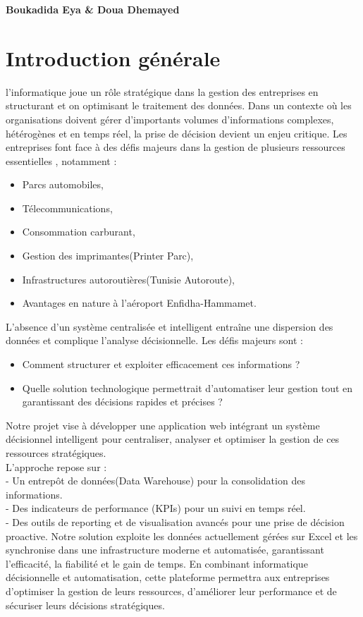 \documentclass[a4paper,11pt]{report}
\begin{document}
\vspace{0.2cm}
\noindent\textbf{Boukadida Eya \& Doua Dhemayed}


\tableofcontents


\clearpage

\newpage 
\section*{ Introduction générale}
l'informatique joue un rôle stratégique dans la gestion des entreprises en structurant et on optimisant le traitement des données. Dans un contexte où les organisations doivent gérer d'importants volumes d'informations complexes, hétérogènes et en temps réel, la prise de décision devient un enjeu critique.
\newline
Les entreprises font face à des défis majeurs dans la gestion de plusieurs ressources essentielles , notamment : 
\begin{itemize}
	\item Parcs automobiles,
	\item Télecommunications,
	\item Consommation carburant,
	\item Gestion des imprimantes(Printer Parc),
	\item Infrastructures autoroutières(Tunisie Autoroute),
	\item Avantages en nature à l'aéroport Enfidha-Hammamet.
\end{itemize}
L'absence d'un système centralisée et intelligent entraîne une dispersion des données et complique l'analyse décisionnelle. Les défis majeurs sont :
\begin{itemize}
	\item Comment structurer et exploiter efficacement ces informations ?
	\item Quelle solution technologique permettrait d'automatiser leur gestion tout en garantissant des décisions rapides et précises ?
\end{itemize}
Notre projet vise à développer une application web intégrant un système décisionnel intelligent pour centraliser, analyser et optimiser la gestion de ces ressources stratégiques.\\
L'approche repose sur :\\
  	 - Un entrepôt de données(Data Warehouse) pour la consolidation des informations.\\
  	 - Des indicateurs de performance (KPIs) pour un suivi en temps réel.\\
  	 - Des outils de reporting et de visualisation avancés pour une prise de décision proactive. 
\vspace{0.2cm}
\newline
Notre solution exploite les données actuellement gérées sur Excel et les synchronise dans une infrastructure moderne et automatisée, garantissant l'efficacité, la fiabilité et le gain de temps.
\vspace{0.2cm}
\newline
En combinant informatique décisionnelle et automatisation, cette plateforme permettra aux entreprises d'optimiser la gestion de leurs ressources, d'améliorer leur performance et de sécuriser leurs décisions stratégiques.
\end{document}
